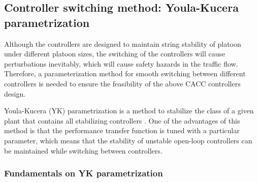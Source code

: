 \documentclass[trsc,nonblindrev]{informs3} %
\begin{document}


\subsection{Controller switching method: Youla-Kucera parametrization}
\label{Section 3.2}

Although the controllers are designed to maintain string stability of platoon under different platoon sizes, the switching of the controllers will cause perturbations inevitably, which will cause safety hazards in the traffic flow. Therefore, a parameterization method for smooth switching between different controllers is needed to ensure the feasibility of the above CACC controllers design.

Youla-Kucera (YK) parametrization is a method to stabilize the class of a given plant that contains all stabilizing controllers \citep{dasgupta1996parametrization,navas2017youla}. One of the advantages of this method is that the performance transfer function is tuned with a particular parameter, which means that the stability of unstable open-loop controllers can be maintained while switching between controllers.

\subsubsection{Fundamentals on YK parametrization}
\label{Section 3.2.1}
\end{document}
